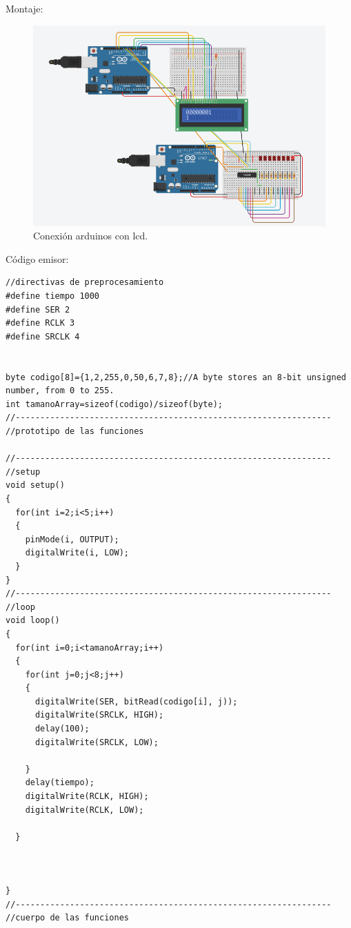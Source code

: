 \documentclass{article}
\begin{document}
Montaje:

\begin{figure}[h]
\includegraphics[scale=0.6]{implementacion lcd bin y dec.png}
\centering
\caption{Conexión arduinos con lcd.}
\label{fig:reemplazo pulsador por arduino}
\end{figure}

\newpage
Código emisor:
\begin{lstlisting}[style=myArduino]
//directivas de preprocesamiento
#define tiempo 1000
#define SER 2
#define RCLK 3
#define SRCLK 4


byte codigo[8]={1,2,255,0,50,6,7,8};//A byte stores an 8-bit unsigned number, from 0 to 255.
int tamanoArray=sizeof(codigo)/sizeof(byte);
//----------------------------------------------------------------
//prototipo de las funciones

//----------------------------------------------------------------
//setup
void setup()
{
  for(int i=2;i<5;i++)
  {
    pinMode(i, OUTPUT);
    digitalWrite(i, LOW);
  }
}
//----------------------------------------------------------------
//loop
void loop()
{
  for(int i=0;i<tamanoArray;i++)
  {
    for(int j=0;j<8;j++)
    {
      digitalWrite(SER, bitRead(codigo[i], j));
      digitalWrite(SRCLK, HIGH);
      delay(100);
      digitalWrite(SRCLK, LOW);

    }
    delay(tiempo);
    digitalWrite(RCLK, HIGH);
    digitalWrite(RCLK, LOW);
    
  }
  
  
  
}
//----------------------------------------------------------------
//cuerpo de las funciones
\end{lstlisting}
\end{document}
